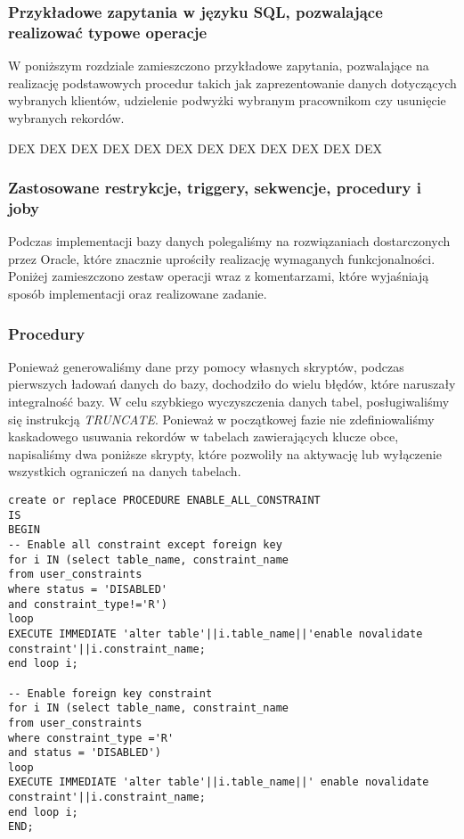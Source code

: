 \documentclass[a4paper]{article}
\begin{document}
\newpage

\subsubsection{Przykładowe zapytania w języku SQL, pozwalające realizować typowe operacje}

W poniższym rozdziale zamieszczono przykładowe zapytania, pozwalające na realizację podstawowych procedur takich jak zaprezentowanie danych dotyczących wybranych klientów, udzielenie podwyżki wybranym pracownikom czy usunięcie wybranych rekordów.

DEX DEX DEX DEX DEX DEX DEX DEX DEX DEX DEX DEX 

\subsubsection{Zastosowane restrykcje, triggery, sekwencje, procedury i joby}

Podczas implementacji bazy danych polegaliśmy na rozwiązaniach dostarczonych przez Oracle, które znacznie uprościły realizację wymaganych funkcjonalności. Poniżej zamieszczono zestaw operacji wraz z komentarzami, które wyjaśniają sposób implementacji oraz realizowane zadanie.

\subsubsection{Procedury}

Ponieważ generowaliśmy dane przy pomocy własnych skryptów, podczas pierwszych ładowań danych do bazy, dochodziło do wielu błędów, które naruszały integralność bazy. W celu szybkiego wyczyszczenia danych tabel, posługiwaliśmy się instrukcją \textit{TRUNCATE}. Ponieważ w początkowej fazie nie zdefiniowaliśmy kaskadowego usuwania rekordów w tabelach zawierających klucze obce, napisaliśmy dwa poniższe skrypty, które pozwoliły na aktywację lub wyłączenie wszystkich ograniczeń na danych tabelach.

\begin{verbatim}
create or replace PROCEDURE ENABLE_ALL_CONSTRAINT
IS
BEGIN
-- Enable all constraint except foreign key
for i IN (select table_name, constraint_name
from user_constraints
where status = 'DISABLED'
and constraint_type!='R')
loop
EXECUTE IMMEDIATE 'alter table'||i.table_name||'enable novalidate constraint'||i.constraint_name;
end loop i;

-- Enable foreign key constraint
for i IN (select table_name, constraint_name
from user_constraints
where constraint_type ='R'
and status = 'DISABLED')
loop
EXECUTE IMMEDIATE 'alter table'||i.table_name||' enable novalidate constraint'||i.constraint_name;
end loop i;
END;

\end{verbatim}
\end{document}
